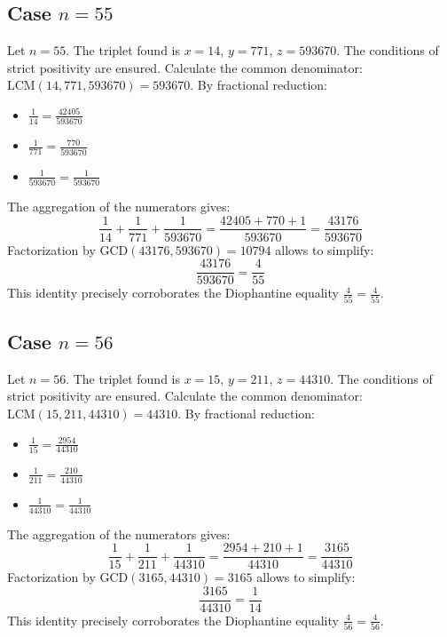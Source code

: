\documentclass[11pt,a4paper]{article}
\begin{document}
\subsection{Case $n = 55$}
Let $n = 55$. The triplet found is $x = 14$, $y = 771$, $z = 593670$.
The conditions of strict positivity are ensured.
Calculate the common denominator: $\text{LCM}(14, 771, 593670) = 593670$.
By fractional reduction:
\begin{itemize}
    \item $\frac{1}{14} = \frac{42405}{593670}$
    \item $\frac{1}{771} = \frac{770}{593670}$
    \item $\frac{1}{593670} = \frac{1}{593670}$
\end{itemize}
The aggregation of the numerators gives:
$$ \frac{1}{14} + \frac{1}{771} + \frac{1}{593670} = \frac{42405 + 770 + 1}{593670} = \frac{43176}{593670} $$
Factorization by $\text{GCD}(43176, 593670) = 10794$ allows to simplify:
$$ \frac{43176}{593670} = \frac{4}{55} $$
This identity precisely corroborates the Diophantine equality $\frac{4}{55} = \frac{4}{55}$.

\subsection{Case $n = 56$}
Let $n = 56$. The triplet found is $x = 15$, $y = 211$, $z = 44310$.
The conditions of strict positivity are ensured.
Calculate the common denominator: $\text{LCM}(15, 211, 44310) = 44310$.
By fractional reduction:
\begin{itemize}
    \item $\frac{1}{15} = \frac{2954}{44310}$
    \item $\frac{1}{211} = \frac{210}{44310}$
    \item $\frac{1}{44310} = \frac{1}{44310}$
\end{itemize}
The aggregation of the numerators gives:
$$ \frac{1}{15} + \frac{1}{211} + \frac{1}{44310} = \frac{2954 + 210 + 1}{44310} = \frac{3165}{44310} $$
Factorization by $\text{GCD}(3165, 44310) = 3165$ allows to simplify:
$$ \frac{3165}{44310} = \frac{1}{14} $$
This identity precisely corroborates the Diophantine equality $\frac{4}{56} = \frac{4}{56}$.
\end{document}
